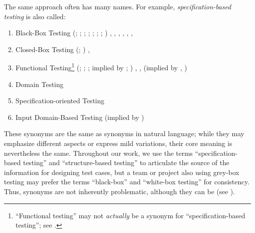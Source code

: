 The same approach often has many names. For example,
\emph{specification-based testing} is also called:
\begin{enumerate}
    \item Black-Box Testing
          \ifnotpaper
              (\citealp[p.~9]{IEEE2022}; \citeyear[p.~8]{IEEE2021};
              \citeyear[p.~431]{IEEE2017}; \citealp[p.~5\=/10]{SWEBOK2024};
              \citealpISTQB{}; \citealp[p.~46 (without hyphen)]{Firesmith2015};
              \citealp[p.~344]{SakamotoEtAl2013}; \citealp[p.~399]{vanVliet2000})
          \else
              \cite[p.~9]{IEEE2022}, \cite{ISTQB}, \cite[p.~431]{IEEE2017},
              \cite[p.~5\=/10]{SWEBOK2024}, \cite[p.~8]{IEEE2021},
              \cite[p.~399]{vanVliet2000},
              \cite[p.~344]{SakamotoEtAl2013}
          \fi
    \item Closed-Box Testing
          \ifnotpaper
              (\citealp[p.~9]{IEEE2022}; \citeyear[p.~431]{IEEE2017})
          \else
              \cite[p.~9]{IEEE2022}, \cite[p.~431]{IEEE2017}
          \fi
    \item Functional Testing\footnote{``Functional testing'' may not
              \emph{actually} be a synonym for ``specification-based testing'';
              see .}
          \ifnotpaper
              (\citealp[p.~196]{IEEE2017}; \citealp[p.~44]{Kam2008};
              \citealp[p.~399]{vanVliet2000}; implied by
              \citealp[p.~129]{IEEE2021}; \citeyear[p.~431]{IEEE2017})
          \else
              \cite[p.~196]{IEEE2017}, \cite[p.~399]{vanVliet2000},
              \cite[p.~44]{Kam2008} (implied by \cite[p.~431]{IEEE2017},
              \cite[p.~129]{IEEE2021})
          \fi
    \item Domain Testing \citep[p.~5\=/10]{SWEBOK2024}
    \item Specification-oriented Testing \citep[p.~440, Fig.~12.2]{PetersAndPedrycz2000}
    \item Input Domain-Based Testing (implied by \citealp[pp.~4\=/7 to
              4\=/8]{SWEBOK2014})
\end{enumerate}

These synonyms are the same as synonyms in natural language; while they may
emphasize different aspects or express mild variations, their core meaning
is nevertheless the same. Throughout our work, we use the terms
``specification-based testing'' and ``structure-based testing'' to articulate
the source of the information for designing test cases, but a team or project
also using grey-box testing may prefer the terms ``black-box'' and ``white-box
testing'' for consistency. Thus, synonyms are not inherently problematic,
although they can be (see ).

